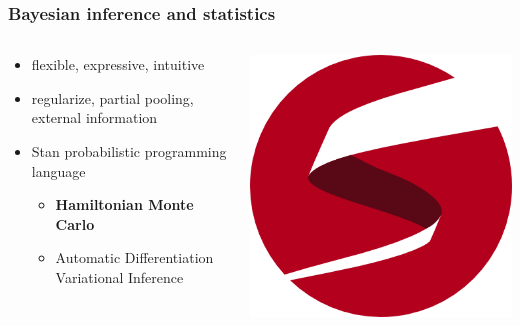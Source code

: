 \documentclass{beamer}
\begin{document}
\begin{frame}
  \frametitle{Bayesian inference and statistics}

  \begin{columns}
    \begin{column}{0.45\textwidth}
      \begin{itemize}
        \item flexible, expressive, intuitive
        \item regularize, partial pooling, external information
        \item Stan probabilistic programming language
          \begin{itemize}
            \item \textbf{Hamiltonian Monte Carlo}
            \item Automatic Differentiation Variational Inference
          \end{itemize}
      \end{itemize}
    \end{column}
    \begin{column}{0.55\textwidth}
      \includegraphics[height=0.9\textheight,width=\textwidth,keepaspectratio=true]{figure/stan_logo}
    \end{column}
  \end{columns}
\end{frame}
\end{document}
